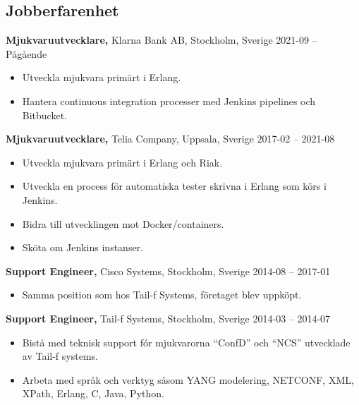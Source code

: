 \documentclass[margin]{res}
\begin{document}

\address{{\bf Kontaktinformation}\\
  
  linkedin.com/in/tommymattsson \\
  github.com/Taddic
}

\address{{\bf Adress}\\
  \\
}

\begin{resume}

\section{Jobberfarenhet}
{\bf Mjukvaruutvecklare,} Klarna Bank AB, Stockholm, Sverige \hfill 2021-09 -- Pågående
 \begin{itemize} \itemsep -2pt  %
 \item Utveckla mjukvara primärt i Erlang.
 \item Hantera continuous integration processer med Jenkins pipelines och Bitbucket.
 \end{itemize}

{\bf Mjukvaruutvecklare,} Telia Company, Uppsala, Sverige \hfill 2017-02 -- 2021-08
 \begin{itemize} \itemsep -2pt  %
 \item Utveckla mjukvara primärt i Erlang och Riak.
 \item Utveckla en process för automatiska tester skrivna i Erlang som körs i Jenkins.
 \item Bidra till utvecklingen mot Docker/containers.
 \item Sköta om Jenkins instanser.
 \end{itemize}

{\bf Support Engineer,} Cisco Systems, Stockholm, Sverige \hfill 2014-08 -- 2017-01
 \begin{itemize} \itemsep -2pt  %
 \item Samma position som hos Tail-f Systems, företaget blev uppköpt.
 \end{itemize}

{\bf Support Engineer,} Tail-f Systems, Stockholm, Sverige \hfill 2014-03 -- 2014-07
 \begin{itemize} \itemsep -2pt  %
 \item Bistå med teknisk support fór mjukvarorna ``ConfD'' och ``NCS''
   utvecklade av Tail-f systems.
 \item Arbeta med språk och verktyg såsom YANG modelering, NETCONF,
   XML, XPath, Erlang, C, Java, Python.
 \end{itemize}


\end{resume}
\end{document}
